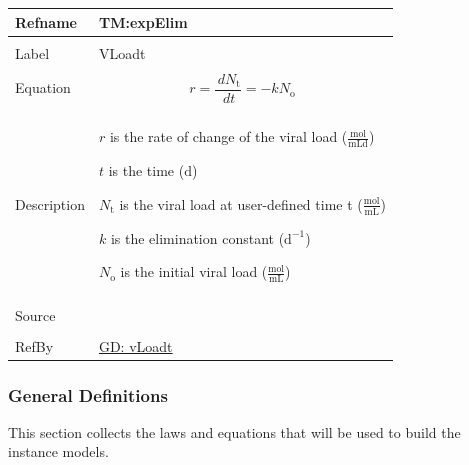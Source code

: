 \documentclass[12pt]{article}
\begin{document}
\vspace{\baselineskip}
\noindent
\begin{minipage}{\textwidth}
\begin{tabular}{>{\raggedright}p{}>{\raggedright\arraybackslash}p{}}
\toprule \textbf{Refname} & \textbf{TM:expElim}
\label{TM:expElim}
\\ \midrule \\
Label & VLoadt
        
\\ \midrule \\
Equation & \begin{displaymath}
           r=\frac{\,d{N_{\text{t}}}}{\,dt}=-k {N_{\text{o}}}
           \end{displaymath}
\\ \midrule \\
Description & \begin{symbDescription}
              \item{$r$ is the rate of change of the viral load ($\frac{\text{mol}}{\text{mL}\text{d}}$)}
              \item{$t$ is the time (${\text{d}}$)}
              \item{${N_{\text{t}}}$ is the viral load at user-defined time t ($\frac{\text{mol}}{\text{mL}}$)}
              \item{$k$ is the elimination constant ($\text{d}^{-1}$)}
              \item{${N_{\text{o}}}$ is the initial viral load ($\frac{\text{mol}}{\text{mL}}$)}
              \end{symbDescription}
\\ \midrule \\
Source & \cite{libretexts2020}
         
\\ \midrule \\
RefBy & \hyperref[GD:vLoadt]{GD: vLoadt}
        
\\ \bottomrule
\end{tabular}
\end{minipage}
\subsubsection{General Definitions}
\label{Sec:GDs}
This section collects the laws and equations that will be used to build the instance models.
\end{document}

